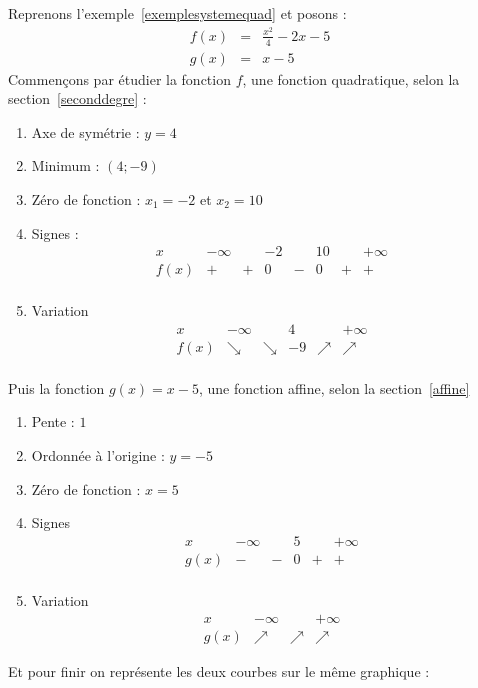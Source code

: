 \begin{exemple}
Reprenons l'exemple~\ref{exemplesystemequad} et posons :
$$
\begin{array}{lcl}
f(x)  &=& \frac{x^2}{4}-2x-5\\
g(x) &=& x-5
\end{array}
$$
Commençons par étudier la fonction $f$, une fonction quadratique, selon la section~\ref{seconddegre} :
\begin{enumerate}
\item Axe de symétrie : $y=4$
\item Minimum : $(4;-9)$
\item Zéro de fonction : $x_1 = -2$ et $x_2 = 10$
\item Signes :
$$
\begin{array}{l|l|l|l|l|l|l|l}
x & -\infty &  & -2 & & 10 & & +\infty\\
\hline
f(x) & +&+ & 0 & - & 0 & +& +\\
\end{array}
$$
\item Variation
$$
\begin{array}{l|l|l|l|l|l}
x & -\infty & & 4 & & + \infty\\
\hline
f(x) & \searrow & \searrow & -9 & \nearrow & \nearrow\\
\end{array}
$$
\end{enumerate}
Puis la fonction $g(x) = x-5$, une fonction affine, selon la section~\ref{affine}
\begin{enumerate}
\item Pente : $1$
\item Ordonnée à l'origine : $y=-5$
\item Zéro de fonction : $x=5$
\item Signes
$$
\begin{array}{l|l|l|l|l|l}
x & -\infty & & 5 & & +\infty\\
\hline
g(x) & - & - & 0 & + & +\\
\end{array}
$$
\item Variation
$$
\begin{array}{l|l|l|l}
x & -\infty & & +\infty\\
\hline
g(x) & \nearrow & \nearrow & \nearrow
\end{array}
$$
\end{enumerate}
Et pour finir on représente les deux courbes sur le même graphique :
\begin{center}

\end{center}
\end{exemple}
